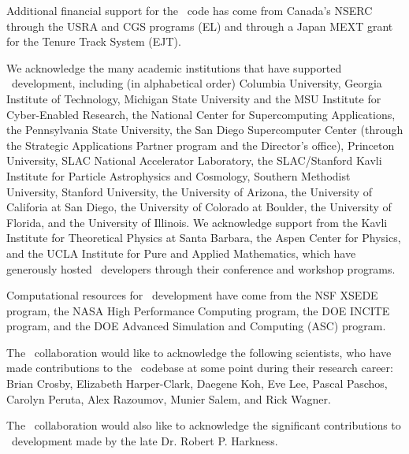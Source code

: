 Additional financial support for the \enzo\ code has come from
Canada's NSERC through the USRA and CGS programs (EL) and through a 
Japan MEXT grant for the Tenure Track System (EJT).

We acknowledge the  many academic institutions that have supported \enzo\
development, including (in alphabetical order)
Columbia University,
Georgia Institute of Technology,
Michigan State University and the MSU Institute for Cyber-Enabled
Research, 
the National Center for Supercomputing Applications, 
the Pennsylvania State University,
 the San Diego Supercomputer Center (through the Strategic Applications
Partner program and the Director’s office),
Princeton University,
SLAC National Accelerator Laboratory,
the SLAC/Stanford Kavli Institute for Particle
Astrophysics and Cosmology,  
Southern Methodist University,
Stanford University,
the University of Arizona,
the University of Califoria at San Diego, 
the University of Colorado at Boulder,
the University of Florida,
and the University of Illinois.
We acknowledge support from the Kavli Institute for Theoretical
Physics at Santa Barbara, the Aspen Center for Physics, and the UCLA
Institute for Pure and Applied Mathematics, which have
generously hosted \enzo\ developers through their conference and
workshop programs.

Computational resources for \enzo\ development have come from the NSF
XSEDE program, the NASA High Performance Computing program, the DOE INCITE
program, and the DOE Advanced Simulation and Computing (ASC) program.

The \enzo\ collaboration would like to acknowledge the following
scientists, who have made contributions to the \enzo\ codebase at some
point during their research career: Brian Crosby, Elizabeth
Harper-Clark, Daegene Koh, Eve Lee, Pascal Paschos, Carolyn Peruta,
Alex Razoumov, Munier Salem, and Rick Wagner.

The \enzo\ collaboration would also like to acknowledge the significant contributions to
\enzo\ development made by the late Dr. Robert P. Harkness. 

